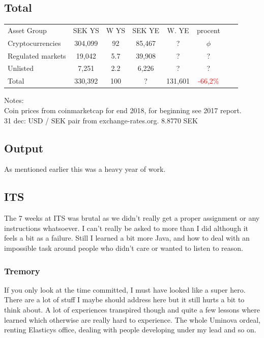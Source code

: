 \documentclass[a4paper]{article}
\begin{document}
\subsection{Total}
\begin{tabular}{l|c|c|c|c|c|c|c}
	Asset Group & SEK YS & W YS & SEK YE & W. YE & procent \\
    Cryptocurrencies  & 304,099 & 92  & 85,467 & ? & $ \phi $ \\
    Regulated markets & 19,042  & 5.7 & 39,908  & ? & ? \\
    Unlisted          & 7,251   & 2.2 & 6,226   & ? & ? \\
    Total & 330,392   & 100     & ?   & 131,601 & \textcolor{red}{-66,2\%} \\
\end{tabular}

Notes: \\
Coin prices from coinmarketcap for end 2018, for beginning see 2017 report. \\


31 dec: USD / SEK pair from exchange-rates.org. 8.8770 SEK \\

\subsection{Output}

As mentioned earlier this was a heavy year of work.

\subsection{ITS}

The 7 weeks at ITS was brutal as we didn't really get a proper assignment or any instructions whatsoever.
I can't really be asked to more than I did although it feels a bit as a failure. Still I learned a bit more
Java, and how to deal with an impossible task around people who didn't care or wanted to listen to reason.

\subsubsection{Tremory}

If you only look at the time committed, I must have looked like a super hero. There are a lot of stuff I maybe should address here but
it still hurts a bit to think about. A lot of experiences transpired though and quite a few lessons where learned which otherwise are really hard to experience. The whole Uminova ordeal, renting Elasticys office, dealing with people developing under my lead and so on. 
\end{document}
